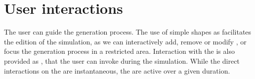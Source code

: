 



\section{User interactions}
\label{sec:env-obj-interaction}
The user can guide the generation process. The use of simple shapes as  facilitates the edition of the simulation, as we can interactively add, remove or modify , or focus the generation process in a restricted area. Interaction with the  is also provided as , that the user can invoke during the simulation. While the direct interactions on the  are instantaneous, the  are active over a given duration.

